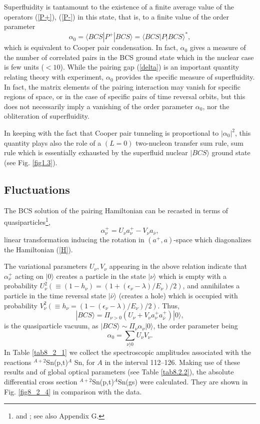 Superfluidity is tantamount to the existence of a finite average value of the operators  (\ref{P+}), (\ref{P-})
in this state, that is, to a finite value of the order parameter
\begin{equation}
\alpha_0 = \langle BCS|P^+|BCS\rangle = \langle BCS|P|BCS\rangle^*,
\end{equation}
 which is equivalent to Cooper pair condensation. In fact, $\alpha_0$ gives  a measure of the 
number of correlated pairs in the BCS ground state which in the nuclear case is few units ($<10$).
While the pairing gap (\ref{delta}) is an important quantity relating theory with experiment, $\alpha_0$ 
provides the specific measure  of superfluidity. In fact, the matrix elements of the pairing interaction
may vanish for specific regions of space,  or in the case of specific pairs of time reversal orbits, but this does not necessarily
imply a vanishing of the order parameter $\alpha_0$, nor the obliteration of superfluidity.

In keeping with the fact that Cooper pair tunneling is proportional to $|\alpha_0|^2$, this quantity plays also the
role of a $(L=0)$ two-nucleon
transfer sum rule, sum rule which is essentially exhausted by the superfluid nuclear $|BCS\rangle$ ground state (see Fig. \ref{fig1.3}). 
\subsection{Fluctuations}
The BCS solution of the pairing Hamiltonian can be recasted in terms of quasiparticles\footnote{\cite{Bogoljubov:58} and  \cite{Valatin:58}; see also \cite{Brink:05} Appendix G.}, 
\begin{equation}\label{eq8.2.9}
\alpha^+_{\nu} = U_{\nu} a^+_{\nu} - V_{\nu} a_{\bar \nu},
\end{equation}
linear transformation inducing the rotation in  $(a^+,a)$-space which diagonalizes  the Hamiltonian (\ref{H}).

The variational parameters $U_{\nu},V_{\nu}$ appearing in the above
relation indicate that $\alpha^+_{\nu}$ acting on $|0\rangle$ creates a particle 
in the state $|\nu\rangle$ which is empty with a probability $U^2_{\nu} (\equiv (1 -h_{\nu})=(1+(\epsilon_\nu-\lambda)/E_\nu)/2)$, and annihilates a particle in the time reversal state $|\bar \nu\rangle$
(creates a hole) which is occupied with probability $V_{\nu}^2 (\equiv h_{\nu}=(1-(\epsilon_\nu-\lambda)/E_\nu)/2)$. Thus, 
\begin{equation}\label{eq8.2.10}
|BCS\rangle = \Pi_{\nu>0} (U_{\nu} +V_{\nu} a^+_{\nu}a^+_{\bar \nu}) |0\rangle,
\end{equation}
is the quasiparticle vacuum, as $|BCS\rangle \sim \Pi_{\nu} \alpha_{\nu} |0\rangle$, the order parameter being 
\begin{equation}
\alpha_0 = \sum_{\nu\rangle 0} U_{\nu}V_{\nu}.
\label{UV}
\end{equation}
In Table \ref{tab8_2_1} we collect the spectroscopic amplitudes associated with  the reactions  
$^{A+2}$Sn(p,t)$^A$ Sn, for $A$ in the interval 112--126. Making use of these results and of  global optical parameters (see Table \ref{tab8.2.2}), the absolute differential cross section $^{A+2}$Sn(p,t)$^A$Sn(gs) were calculated. They are shown in Fig. \ref{fig8_2_4} in comparison with the data.
